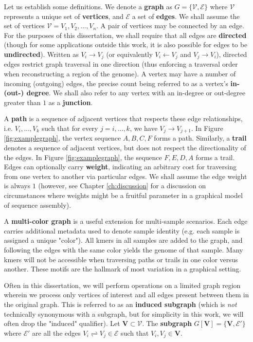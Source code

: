 Let us establish some definitions.  We denote a \textbf{graph} as $G = \{\mathcal{V}, \mathcal{E}\}$ where $\mathcal{V}$ represents a unique set of \textbf{vertices}, and $\mathcal{E}$ a set of \textbf{edges}\cite{Koller:2009ty}.  We shall assume the set of vertices $\mathcal{V} = V_1, V_2, ..., V_n$.  A pair of vertices may be connected by an edge.  For the purposes of this dissertation, we shall require that all edges are \textbf{directed} (though for some applications outside this work, it is also possible for edges to be \textbf{undirected}).  Written as $V_i \rightarrow V_j$ (or equivalently $V_i \leftarrow V_j$ and $V_j \rightarrow V_i$), directed edges restrict graph traversal in one direction (thus enforcing a traversal order when reconstructing a region of the genome).  A vertex may have a number of incoming (outgoing) edges, the precise count being referred to as a vertex's \textbf{in- (out-) degree}.  We shall also refer to any vertex with an in-degree or out-degree greater than $1$ as a \textbf{junction}.

A \textbf{path} is a sequence of adjacent vertices that respects these edge relationships, i.e. $V_i, ..., V_k$ such that for every $j = i, ..., k$, we have $V_j \rightarrow V_{j+1}$.  In Figure \ref{fig:examplegraph}, the vertex sequence $A, B, C, F$ forms a path.  Similarly, a \textbf{trail} denotes a sequence of adjacent vertices, but does not respect the directionality of the edges.  In Figure \ref{fig:examplegraph}, the sequence $F, E, D, A$ forms a trail.  Edges can optionally carry \textbf{weight}, indicating an arbitrary cost for traversing from one vertex to another via particular edges.  We shall assume the edge weight is always $1$ (however, see Chapter \ref{ch:discussion} for a discussion on circumstances where weights might be a fruitful parameter in a graphical model of sequence assembly).

A \textbf{multi-color graph} is a useful extension for multi-sample scenarios.  Each edge carries additional metadata used to denote sample identity (e.g. each sample is assigned a unique "color").  All kmers in all samples are added to the graph, and following the edges with the same color yields the genome of that sample.  Many kmers will not be accessible when traversing paths or trails in one color versus another.  These motifs are the hallmark of most variation in a graphical setting.

Often in this dissertation, we will perform operations on a limited graph region wherein we process only vertices of interest and all edges present between them in the original graph.  This is referred to as an \textbf{induced subgraph} (which is \textit{not} technically synonymous with a subgraph, but for simplicity in this work, we will often drop the "induced" qualifier).  Let $\mathbf{V} \subset \mathcal{V}$.  The \textbf{subgraph} $G[\mathbf{V}] = \{\mathbf{V}, \mathcal{E'}\}$ where $\mathcal{E'}$ are all the edges $V_i \rightleftharpoons V_j \in \mathcal{E}$ such that $V_i, V_j \in \mathbf{V}$.

